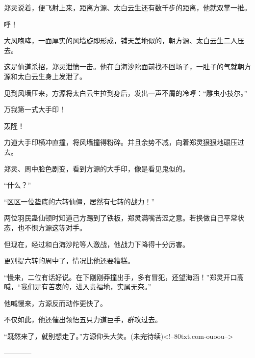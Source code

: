 \begin{this_body}
郑灵说着，便飞射上来，距离方源、太白云生还有数千步的距离，他就双掌一推。

呼！

大风咆哮，一面厚实的风墙旋即形成，铺天盖地似的，朝方源、太白云生二人压去。

这是仙道杀招，郑灵泄愤一击。他在白海沙陀面前找不回场子，一肚子的气就朝方源和太白云生身上发泄了。

见到风墙压来，方源将太白云生拉到身后，发出一声不屑的冷哼：“雕虫小技尔。”

万我第一式大手印！

轰隆！

力道大手印横冲直撞，将风墙撞得粉碎。并且余势不减，向着郑灵狠狠地碾压过去。

郑灵、周中脸色剧变，看到方源的大手印，像是看见鬼似的。

“什么？”

“区区一位垫底的六转仙僵，居然有七转的战力！”

两位羽民蛊仙顿时知道己方踢到了铁板，郑灵满嘴苦涩之意。若换做自己平常状态，也不惧方源这等对手。

但现在，经过和白海沙陀等人激战，他战力下降得十分厉害。

更别提六转的周中了，情况比他还要糟糕。

“慢来，二位有话好说。在下刚刚莽撞出手，多有冒犯，还望海涵！”郑灵开口高喊，“我们是有苦衷的，进入贵福地，实属无奈。”

他喊慢来，方源反而动作更快了。

不仅如此，他还催出领悟五只力道巨手，群攻过去。

“既然来了，就别想走了。”方源仰头大笑。(未完待续)<!--80txt.com-ouoou-->

------------

\end{this_body}

